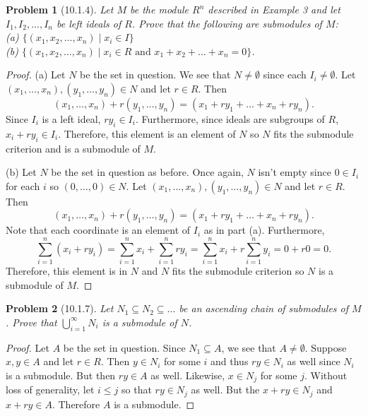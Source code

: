 \documentclass{article}
\newtheorem{problem}{Problem}
\begin{document}
\begin{problem}[10.1.4]
Let $M$ be the module $R^n$ described in Example 3 and let $I_1, I_2, \dots , I_n$ be left ideals of $R$. Prove that the following are submodules of $M$:\\
(a) $\{(x_1, x_2, \dots , x_n) \mid x_i \in I\}$\\
(b) $\{(x_1, x_2, \dots , x_n) \mid x_i \in R \text{ and } x_1 + x_2 + \dots + x_n = 0\}$.
\end{problem}
\begin{proof}
(a) Let $N$ be the set in question. We see that $N \neq \emptyset$ since each $I_i \neq \emptyset$. Let $(x_1, \dots , x_n), (y_1, \dots , y_n) \in N$ and let $r \in R$. Then
\[
(x_1, \dots , x_n) + r(y_1, \dots , y_n) = (x_1 + ry_1 + \dots + x_n + ry_n).
\]
Since $I_i$ is a left ideal, $ry_i \in I_i$. Furthermore, since ideals are subgroups of $R$, $x_i + ry_i \in I_i$. Therefore, this element is an element of $N$ so $N$ fits the submodule criterion and is a submodule of $M$.

(b) Let $N$ be the set in question as before. Once again, $N$ isn't empty since $0 \in I_i$ for each $i$ so $(0, \dots , 0) \in N$. Let $(x_1, \dots , x_n), (y_1, \dots , y_n) \in N$ and let $r \in R$. Then
\[
(x_1, \dots , x_n) + r(y_1, \dots , y_n) = (x_1 + ry_1 + \dots + x_n + ry_n).
\]
Note that each coordinate is an element of $I_i$ as in part (a). Furthermore,
\[
\sum_{i=1}^{n} (x_i + ry_i) = \sum_{i=1}^{n} x_i + \sum_{i=1}^{n}ry_i = \sum_{i=1}^{n} x_i + r \sum_{i=1}^{n} y_i = 0 + r0 = 0.
\]
Therefore, this element is in $N$ and $N$ fits the submodule criterion so $N$ is a submodule of $M$.
\end{proof}

\begin{problem}[10.1.7]
Let $N_1 \subseteq N_2 \subseteq \dots$ be an ascending chain of submodules of $M$. Prove that $\bigcup_{i=1}^{\infty} N_i$ is a submodule of $N$.
\end{problem}
\begin{proof}
Let $A$ be the set in question. Since $N_1 \subseteq A$, we see that $A \neq \emptyset$. Suppose $x,y \in A$ and let $r \in R$. Then $y \in N_i$ for some $i$ and thus $ry \in N_i$ as well since $N_i$ is a submodule. But then $ry \in A$ as well. Likewise, $x \in N_j$ for some $j$. Without loss of generality, let $i \leq j$ so that $ry \in N_j$ as well. But the $x+ry \in N_j$ and $x + ry \in A$. Therefore $A$ is a submodule.
\end{proof}
\end{document}
